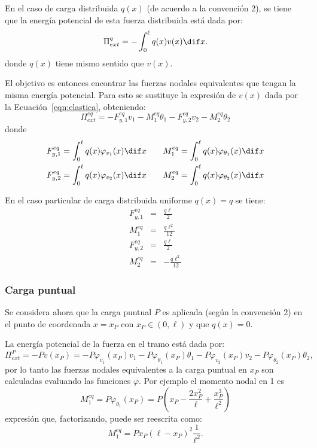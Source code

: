 En el caso de carga distribuida $q(x)$ (de acuerdo a la convención 2), se tiene que la energía potencial de esta fuerza distribuida está dada por:
%
\begin{equation}
	\Pi_{ext}^q =
	- \int_0^\ell q(x) v(x) \dif x.
\end{equation}
%
donde $q(x)$ tiene mismo sentido que $v(x)$.

El objetivo es entonces encontrar las fuerzas nodales equivalentes que tengan la misma energía potencial. Para esto se sustituye la expresión de $v(x)$ dada por la Ecuación~\eqref{eqn:elastica}, obteniendo:
%
\begin{equation}
	\Pi_{ext}^{eq} =
	-F_{y,1}^{eq} v_1 - M_1^{eq} \theta_1 -F_{y,2}^{eq} v_2 -  M_2^{eq} \theta_2
\end{equation}
donde
\begin{eqnarray}
	F_{y,1}^{eq} = \int_{0}^{\ell} q(x) \varphi_{v_1}(x) \dif x \qquad & \displaystyle M_1^{eq} = \int_{0}^{\ell}q(x) \varphi_{\theta_1}(x)  \dif x  \nonumber\\
	F_{y,2}^{eq} = \int_{0}^{\ell}q(x) \varphi_{v_2}(x)  \dif x \qquad & \displaystyle M_2^{eq} = \int_{0}^{\ell} q(x)\varphi_{\theta_2}(x)  \dif x  \nonumber
\end{eqnarray}

En el caso particular de carga distribuida uniforme $q(x) = q$ se tiene:
%
\begin{eqnarray}
	F_{y,1}^{eq} &=& \frac{q \ell}{2} \\
	M_1^{eq} &=& \frac{q \ell^{2}}{12} \\
	F_{y,2}^{eq} &=& \frac{q \ell}{2} \\
	M_2^{eq} &=& - \frac{q \ell^{2}}{12}
\end{eqnarray}

\subsubsection{Carga puntual}

Se considera ahora que la carga puntual $P$ es aplicada (según la convención 2) en el punto de coordenada $x= x_P$ con $x_P \in (0,\ell)$ y que $q(x)=0$.

La energía potencial de la fuerza en el tramo está dada por:
%
\begin{equation}
	\Pi_{ext}^{P} = - P v (x_P) =  -P \varphi_{v_1}(x_P) v_1 - P \varphi_{\theta_1}(x_P) \theta_1
	- P \varphi_{v_2}(x_P) v_2 - P \varphi_{\theta_2}(x_P) \theta_2,
\end{equation}
%
por lo tanto las fuerzas nodales equivalentes a la carga puntual en $x_P$ son calculadas evaluando las funciones $\varphi$. %
%
Por ejemplo el momento nodal en 1 es
%
\begin{equation}
	M_1^{eq} = P \varphi_{\theta_1} (x_P) = P  \left(x_P - \frac{2 x_P^{2}}{\ell} + \frac{x_P^{3}}{\ell^{2}}\right)
\end{equation}
%
expresión que, factorizando, puede ser reescrita como:
\begin{equation}\label{eqn:M1eqP}
	M_1^{eq} = P x_P (\ell-x_P)^2 \frac{1}{\ell^2}.
\end{equation}

